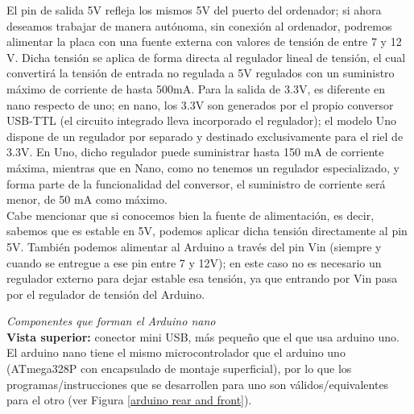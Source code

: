 \documentclass[12pt]{article}
\begin{document}
	
	\noindent El pin de salida 5V refleja los mismos 5V del puerto  del ordenador; si ahora deseamos trabajar de manera autónoma, sin conexión al ordenador, podremos alimentar la placa con una fuente externa con valores de tensión de entre 7 y 12 V. Dicha tensión se aplica de forma directa al regulador lineal de tensión, el cual convertirá la tensión de entrada no regulada a 5V regulados con un suministro máximo de corriente de hasta 500mA. Para la salida de 3.3V, es diferente en nano respecto de uno; en nano, los 3.3V son generados por el propio conversor USB-TTL (el circuito integrado lleva incorporado el regulador); el modelo Uno dispone de un regulador por separado y destinado exclusivamente para el riel de 3.3V. En Uno, dicho regulador puede suministrar hasta 150 mA de corriente máxima, mientras que en Nano, como no tenemos un regulador especializado, y forma parte de la funcionalidad del conversor, el suministro de corriente será menor, de 50 mA como máximo. \\
	
	\noindent Cabe mencionar que si conocemos bien la fuente de alimentación, es decir, sabemos que es estable en 5V, podemos aplicar dicha tensión directamente al pin 5V. También podemos alimentar al Arduino a través del pin Vin (siempre y cuando se entregue a ese pin entre 7 y 12V); en este caso no es necesario un regulador externo para dejar estable esa tensión, ya que entrando por Vin pasa por el regulador de tensión del Arduino. 
	
	\pagebreak
	
	
	\noindent \textit{Componentes que forman el Arduino nano} \\
	
	\noindent \textbf{Vista superior:} conector mini USB, más pequeño que el que usa arduino uno. El arduino nano tiene el mismo microcontrolador que el arduino uno (ATmega328P con encapsulado de montaje superficial), por lo que los programas/instrucciones que se desarrollen para uno son válidos/equivalentes para el otro (ver Figura \ref{arduino rear and front}). \\
	
\end{document}

